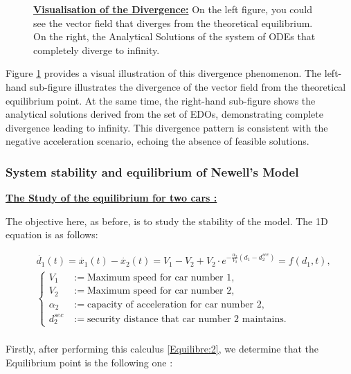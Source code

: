 \documentclass{article}
\begin{document}
\begin{figure}[H]
\begin{subfigure}{0.51\textwidth}
			\end{subfigure}
			\caption[Visualisation of the Divergence]{\textbf{\underline{Visualisation of the Divergence:}} On the left figure, you could see the vector field that diverges from the theoretical equilibrium. On the right, the Analytical Solutions of the system of ODEs that completely diverge to infinity.}
			\label{fig:SE2}
		\end{figure}
		
		Figure \ref{fig:SE2} provides a visual illustration of this divergence phenomenon. The left-hand sub-figure illustrates the divergence of the vector field from the theoretical equilibrium point. At the same time, the right-hand sub-figure shows the analytical solutions derived from the set of EDOs, demonstrating complete divergence leading to infinity. This divergence pattern is consistent with the negative acceleration scenario, echoing the absence of feasible solutions.
		
		
	\subsubsection{System stability and equilibrium of Newell's Model}
	
	\textbf{\underline{The Study of the equilibrium for two cars : }} \newline\newline
	
	
	The objective here, as before, is to study the stability of the model. The 1D equation is as follows:
	
	\begin{align*}
		&\dot{d_1}(t) = \dot{x_1}(t) - \dot{x_2}(t) = V_1 - V_2 + V_2 \cdot e^{-\frac{\alpha_2}{V_2}(d_1 - d_{2}^{sec})} = f(d_1, t), \\
		&\left\{
		\begin{aligned}
			V_1 &:= \text{Maximum speed for car number 1}, \\
			V_2 &:= \text{Maximum speed for car number 2}, \\
			\alpha_2 &:= \text{capacity of acceleration for car number 2}, \\
			d_{2}^{sec} &:= \text{security distance that car number 2 maintains}.
		\end{aligned}
		\right.
	\end{align*} \\ Firstly, after performing this calculus \ref{Equilibre:2}, we determine that the Equilibrium point is the following one : 
	
\end{document}
